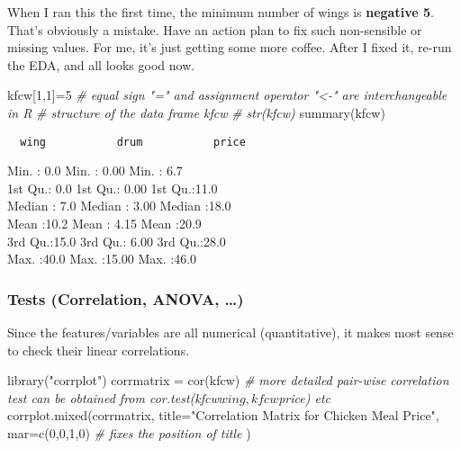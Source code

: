 \documentclass[
]{article}
\newenvironment{Shaded}{\begin{snugshade}}{\end{snugshade}}
\newcommand{\AttributeTok}[1]{\textcolor[rgb]{0.77,0.63,0.00}{#1}}
\newcommand{\CommentTok}[1]{\textcolor[rgb]{0.56,0.35,0.01}{\textit{#1}}}
\newcommand{\DecValTok}[1]{\textcolor[rgb]{0.00,0.00,0.81}{#1}}
\newcommand{\FunctionTok}[1]{\textcolor[rgb]{0.00,0.00,0.00}{#1}}
\newcommand{\NormalTok}[1]{#1}
\newcommand{\OtherTok}[1]{\textcolor[rgb]{0.56,0.35,0.01}{#1}}
\newcommand{\StringTok}[1]{\textcolor[rgb]{0.31,0.60,0.02}{#1}}
\begin{document}
When I ran this the first time, the minimum number of wings is
\textbf{negative 5}. That's obviously a mistake. Have an action plan to
fix such non-sensible or missing values. For me, it's just getting some
more coffee. After I fixed it, re-run the EDA, and all looks good now.

\begin{Shaded}
\begin{Highlighting}[]
\NormalTok{kfcw[}\DecValTok{1}\NormalTok{,}\DecValTok{1}\NormalTok{]}\OtherTok{=}\DecValTok{5}  \CommentTok{\# equal sign "=" and assignment operator "\textless{}{-}" are interchangeable in R}
\CommentTok{\# structure of the data frame kfcw}
\CommentTok{\# str(kfcw)}
\FunctionTok{summary}\NormalTok{(kfcw)}
\end{Highlighting}
\end{Shaded}

\begin{verbatim}
  wing           drum           price     
\end{verbatim}

Min. : 0.0 Min. : 0.00 Min. : 6.7\\
1st Qu.: 0.0 1st Qu.: 0.00 1st Qu.:11.0\\
Median : 7.0 Median : 3.00 Median :18.0\\
Mean :10.2 Mean : 4.15 Mean :20.9\\
3rd Qu.:15.0 3rd Qu.: 6.00 3rd Qu.:28.0\\
Max. :40.0 Max. :15.00 Max. :46.0

\hypertarget{tests-correlation-anova}{%
\subsubsection{Tests (Correlation, ANOVA,
\ldots)}\label{tests-correlation-anova}}

Since the features/variables are all numerical (quantitative), it makes
most sense to check their linear correlations.

\begin{Shaded}
\begin{Highlighting}[]
\FunctionTok{library}\NormalTok{(}\StringTok{"corrplot"}\NormalTok{)}
\NormalTok{corrmatrix }\OtherTok{=} \FunctionTok{cor}\NormalTok{(kfcw)  }\CommentTok{\# more detailed pair{-}wise correlation test can be obtained from cor.test(kfcw$wing,kfcw$price) etc}
\FunctionTok{corrplot.mixed}\NormalTok{(corrmatrix, }
               \AttributeTok{title=}\StringTok{"Correlation Matrix for Chicken Meal Price"}\NormalTok{,}
               \AttributeTok{mar=}\FunctionTok{c}\NormalTok{(}\DecValTok{0}\NormalTok{,}\DecValTok{0}\NormalTok{,}\DecValTok{1}\NormalTok{,}\DecValTok{0}\NormalTok{) }\CommentTok{\# fixes the position of title}
\NormalTok{               )}
\end{Highlighting}
\end{Shaded}
\end{document}
